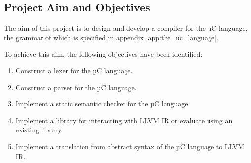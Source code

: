
\subsection{Project Aim and Objectives}
\label{sec:intro_project_aim_and_objectives}

The aim of this project is to design and develop a compiler for the µC language, the grammar of which is specified in appendix \ref{app:the_uc_language}.

To achieve this aim, the following objectives have been identified:

\begin{enumerate}
	\item \label{itm:obj_lexical_analysis} Construct a lexer for the µC language.
	\item \label{itm:obj_syntactic_analysis} Construct a parser for the µC language.
	\item \label{itm:obj_semantic_analysis} Implement a static semantic checker for the µC language.
	\item \label{itm:obj_intermediate_representation} Implement a library for interacting with LLVM IR or evaluate using an existing library.
	\item \label{itm:obj_ir_generation} Implement a translation from abstract syntax of the µC language to LLVM IR.
\end{enumerate}
